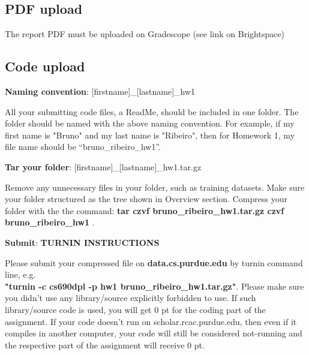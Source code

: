 \documentclass{article}
\newcommand{\homeworknumber}{1}
\begin{document}
\hfill

\subsection*{\bf PDF upload}

The report PDF must be uploaded on Gradescope (see link on Brightspace)

\hfill


\subsection*{\bf Code upload}

\noindent \textbf{Naming convention}: [firstname]\_[lastname]\_hw\homeworknumber

All your submitting code files, a ReadMe, should be included in one folder. The folder should be named with the above naming convention. For example, if my first name is "Bruno" and my last name is "Ribeiro", then for Homework \homeworknumber, my file name should be ``bruno\_ribeiro\_hw\homeworknumber''.


\hfill

\noindent \textbf{Tar your folder}: [firstname]\_[lastname]\_hw\homeworknumber.tar.gz

Remove any unnecessary files in your folder, such as training datasets. Make sure your folder structured as the tree shown in Overview section. Compress your folder with the the command: \textbf{tar czvf bruno\_ribeiro\_hw\homeworknumber.tar.gz czvf bruno\_ribeiro\_hw\homeworknumber} .

\hfill

\noindent \textbf{Submit}: 
{\bf TURNIN INSTRUCTIONS}

Please submit your compressed file on \textbf{data.cs.purdue.edu} by turnin command line, e.g.\\ \textbf{"turnin -c cs690dpl -p hw\homeworknumber{} bruno\_ribeiro\_hw\homeworknumber.tar.gz"}.
Please make sure you didn’t use any library/source explicitly forbidden to use. If such library/source code is used, you will get 0 pt for the coding part of the assignment. If your code doesn’t run on scholar.rcac.purdue.edu, then even if it compiles in another computer, your code will still be considered not-running and the respective part of the assignment will receive 0 pt.



\end{document}
